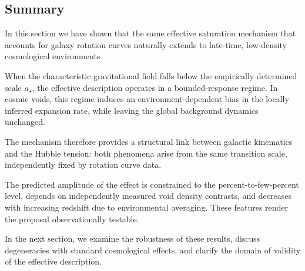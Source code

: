 \subsection{Summary}
  \label{subsec:void_summary}

  In this section we have shown that the same effective saturation mechanism
  that accounts for galaxy rotation curves naturally extends to
  late-time, low-density cosmological environments.

  When the characteristic gravitational field falls below the
  empirically determined scale $a_\star$,
  the effective description operates in a bounded-response regime.
  In cosmic voids, this regime induces an environment-dependent
  bias in the locally inferred expansion rate,
  while leaving the global background dynamics unchanged.

  The mechanism therefore provides a structural link between
  galactic kinematics and the Hubble tension:
  both phenomena arise from the same transition scale,
  independently fixed by rotation curve data.

  The predicted amplitude of the effect is constrained to the
  percent-to-few-percent level,
  depends on independently measured void density contrasts,
  and decreases with increasing redshift due to environmental averaging.
  These features render the proposal observationally testable.

  In the next section, we examine the robustness of these results,
  discuss degeneracies with standard cosmological effects,
  and clarify the domain of validity of the effective description.
